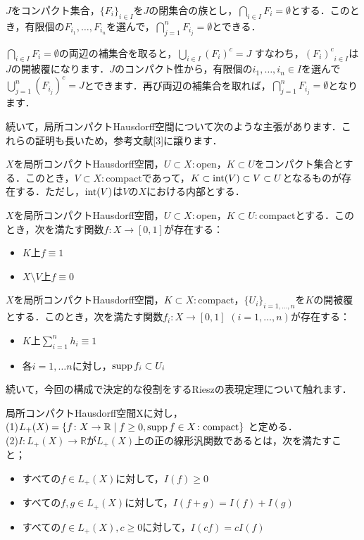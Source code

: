 \begin{ylem}\label{4}
$J$をコンパクト集合，$\{ F_i \}_{i \in I}$を$J$の閉集合の族とし，$\bigcap_{i \in I}F_i = \emptyset$とする．このとき，有限個の$F_{i_1}, \ldots , F_{i_n}$を選んで，$\bigcap_{j=1}^{n}F_{i_j} = \emptyset$とできる．
\end{ylem}
\begin{Proof}
$\bigcap_{i \in I}F_i = \emptyset$の両辺の補集合を取ると，$\bigcup_{i \in I}(F_i)^{c} = J$ すなわち，${(F_i)^{c}}_{i \in I}$は$J$の開被覆になります．$J$のコンパクト性から，有限個の$i_1, \ldots , i_n \in I$を選んで$\bigcup_{j=1}^{n}(F_{i_j})^{c} = J$とできます．再び両辺の補集合を取れば，$\bigcap_{j=1}^{n}F_{i_j} = \emptyset$となります．
\end{Proof}
続いて，局所コンパクトHausdorff空間について次のような主張があります．これらの証明も長いため，参考文献[3]に譲ります．
\begin{ythm}\label{5}
$X$を局所コンパクトHausdorff空間，$U \subset X \colon \mathrm{open}$，$K \subset U$をコンパクト集合とする．このとき，$V \subset X :\mathrm{compact}$であって，$K \subset \operatorname{int}(V) \subset V \subset U$となるものが存在する．ただし，$\operatorname{int}(V)$は$V$の$X$における内部とする．
\end{ythm}
\begin{ythm}[Urysohnの補題]\label{6}
$X$を局所コンパクトHausdorff空間，$U \subset X \colon \mathrm{open}$，$K \subset U \colon \mathrm{compact}$とする．このとき，次を満たす関数$f \colon X \to [0, 1]$が存在する：
\begin{itemize}
 \item $K$上$f \equiv 1$
 \item $X \setminus V$上$f \equiv 0$
\end{itemize}
\end{ythm}
\begin{ythm}[1の分割]\label{7}
$X$を局所コンパクトHausdorff空間，$K \subset X \colon \mathrm{compact}$，$\{ U_i \}_{i=1, \ldots , n}$を$K$の開被覆とする．このとき，次を満たす関数$f_i \colon X \to [0,1]$ $(i=1, \ldots , n)$が存在する：
\begin{itemize}
 \item $K$上$\sum_{i=1}^{n}h_i \equiv 1$
 \item 各$i=1, \ldots n$に対し，$\operatorname{supp} f_i \subset U_i$
\end{itemize}
\end{ythm}
続いて，今回の構成で決定的な役割をするRieszの表現定理について触れます．
\begin{ydefi}\label{8}
局所コンパクトHausdorff空間Xに対し， \\
 (1)$L_{+}(X)= \{ f \colon X \to \mathbb{R} \mid f \ge 0, \operatorname{supp} f \in X \colon \mathrm{compact}\}$ と定める． \\
 (2)$I \colon L_{+}(X) \to \mathbb{R}$が$L_{+}(X)$上の正の線形汎関数であるとは，次を満たすこと；
\begin{itemize}
 \item すべての$f \in L_{+}(X)$に対して，$I(f) \ge 0$
 \item すべての$f,g \in L_{+}(X)$に対して，$I(f+g)=I(f)+I(g)$
 \item すべての$f \in L_{+}(X), c \ge 0$に対して，$I(cf)=cI(f)$
\end{itemize}
\end{ydefi}
